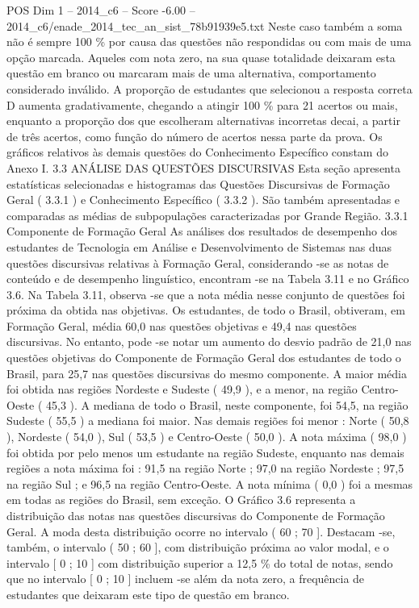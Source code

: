 \begin{textsample}{POS Dim 1 – 2014\_c6 – Score -6.00 – 2014\_c6/enade\_2014\_tec\_an\_sist\_78b91939e5.txt}
Neste caso também a soma não é sempre 100 \% por causa das questões não respondidas ou com mais de uma opção marcada.
Aqueles com nota zero, na sua quase totalidade deixaram esta questão em branco ou marcaram mais de uma alternativa, comportamento considerado inválido.
A proporção de estudantes que selecionou a resposta correta D aumenta gradativamente, chegando a atingir 100 \% para 21 acertos ou mais, enquanto a proporção dos que escolheram alternativas incorretas decai, a partir de três acertos, como função do número de acertos nessa parte da prova.
Os gráficos relativos às demais questões do Conhecimento Específico constam do Anexo I. 3.3 ANÁLISE DAS QUESTÕES DISCURSIVAS Esta seção apresenta estatísticas selecionadas e histogramas das Questões Discursivas de Formação Geral ( 3.3.1 ) e Conhecimento Específico ( 3.3.2 ).
São também apresentadas e comparadas as médias de subpopulações caracterizadas por Grande Região. 3.3.1 Componente de Formação Geral As análises dos resultados de desempenho dos estudantes de Tecnologia em Análise e Desenvolvimento de Sistemas nas duas questões discursivas relativas à Formação Geral, considerando -se as notas de conteúdo e de desempenho linguístico, encontram -se na Tabela 3.11 e no Gráfico 3.6.
Na Tabela 3.11, observa -se que a nota média nesse conjunto de questões foi próxima da obtida nas objetivas.
Os estudantes, de todo o Brasil, obtiveram, em Formação Geral, média 60,0 nas questões objetivas e 49,4 nas questões discursivas.
No entanto, pode -se notar um aumento do desvio padrão de 21,0 nas questões objetivas do Componente de Formação Geral dos estudantes de todo o Brasil, para 25,7 nas questões discursivas do mesmo componente.
A maior média foi obtida nas regiões Nordeste e Sudeste ( 49,9 ), e a menor, na região Centro-Oeste ( 45,3 ).
A mediana de todo o Brasil, neste componente, foi 54,5, na região Sudeste ( 55,5 ) a mediana foi maior.
Nas demais regiões foi menor : Norte ( 50,8 ), Nordeste ( 54,0 ), Sul ( 53,5 ) e Centro-Oeste ( 50,0 ).
A nota máxima ( 98,0 ) foi obtida por pelo menos um estudante na região Sudeste, enquanto nas demais regiões a nota máxima foi : 91,5 na região Norte ; 97,0 na região Nordeste ; 97,5 na região Sul ; e 96,5 na região Centro-Oeste.
A nota mínima ( 0,0 ) foi a mesmas em todas as regiões do Brasil, sem exceção.
O Gráfico 3.6 representa a distribuição das notas nas questões discursivas do Componente de Formação Geral.
A moda desta distribuição ocorre no intervalo ( 60 ; 70 ].
Destacam -se, também, o intervalo ( 50 ; 60 ], com distribuição próxima ao valor modal, e o intervalo [ 0 ; 10 ] com distribuição superior a 12,5 \% do total de notas, sendo que no intervalo [ 0 ; 10 ] incluem -se além da nota zero, a frequência de estudantes que deixaram este tipo de questão em branco.

\end{textsample}
